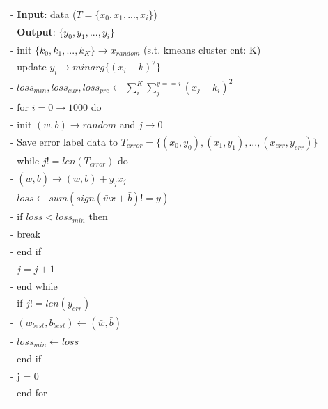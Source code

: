 \documentclass[11pt]{article}
\begin{document}
\begin{longtable}[]{@{}l@{}}
\toprule
- \textbf{Input}: data
(\(T = \{x_{0}, x_{1}, ..., x_{i}\}\))\tabularnewline
- \textbf{Output}: \(\{y_{0}, y_{1}, ..., y_{i}\}\)\tabularnewline
- init \(\{k_{0}, k_{1}, ..., k_{K}\} \rightarrow x_{random}\) (s.t.
kmeans cluster cnt: K)\tabularnewline
- update \(y_{i} \rightarrow minarg\{(x_{i} - k)^2\}\)\tabularnewline
-
\(loss_{min}, loss_{cur}, loss_{pre} \leftarrow \sum\limits_i^K {\sum\limits_j^{y = = i} {{{({x_j} - {k_i})}^2}} }\)\tabularnewline
- for \(i= 0\rightarrow1000\) do\tabularnewline
- init \((w, b)\rightarrow random\) and
\(j\rightarrow 0\)\tabularnewline
- Save error label data to
\(T_{error} = \{(x_{0}, y_{0}), (x_{1}, y_{1}), ..., (x_{err}, y_{err})\}\)\tabularnewline
- while \(j != len(T_{error})\) do\tabularnewline
- \((\bar{w}, \bar{b}) \rightarrow (w, b) + y_{j}x_{j}\)\tabularnewline
- \(loss \leftarrow sum(sign(\bar{w}x + \bar{b}) != y)\)\tabularnewline
- if \(loss < loss_{min}\) then\tabularnewline
- break\tabularnewline
- end if\tabularnewline
- \(j=j+1\)\tabularnewline
- end while\tabularnewline
- if \(j != len(y_{err})\)\tabularnewline
- \((w_{best}, b_{best}) \leftarrow (\bar{w}, \bar{b})\)\tabularnewline
- \(loss_{min} \leftarrow loss\)\tabularnewline
- end if\tabularnewline
- j = 0\tabularnewline
- end for\tabularnewline
\bottomrule
\end{longtable}
\end{document}

